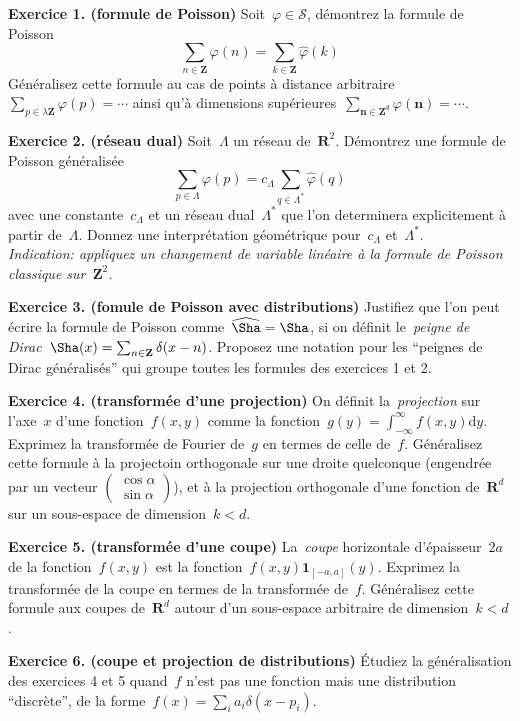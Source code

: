 \documentclass[a4paper,11pt]{article}
\def\ud{\mathrm{d}}
\def\R{\mathbf{R}}
\def\S{\mathcal{S}}
\def\Z{\mathbf{Z}}
\begin{document}
{\bf Exercice 1. (formule de Poisson)}
Soit~$\varphi\in\S$, démontrez la formule de Poisson
\[
	\sum_{n\in\Z}\varphi(n)=\sum_{k\in\Z}\widehat\varphi(k)
\]
Généralisez cette formule au cas de points à distance
arbitraire~$\displaystyle\sum_{p\in\lambda\Z}\varphi(p)=\cdots$ ainsi qu'à
dimensions
supérieures~$\displaystyle\sum_{\mathbf{n}\in\Z^d}\varphi(\mathbf{n})=\cdots$.

{\bf Exercice 2. (réseau dual)}
Soit~$\Lambda$ un réseau de~$\R^2$.
Démontrez une formule de Poisson généralisée
\[
	\sum_{p\in\Lambda}\varphi(p)
	=
	c_\Lambda\sum_{q\in\Lambda^*}\widehat\varphi(q)
\]
avec une constante~$c_\Lambda$ et un réseau dual~$\Lambda^*$ que l'on
determinera explicitement à partir de~$\Lambda$.  Donnez une interprétation
géométrique pour~$c_\Lambda$ et~$\Lambda^*$.\\
{\sl Indication: appliquez un changement de variable linéaire à la formule de
Poisson classique sur~$\Z^2$.}

{\bf Exercice 3. (fomule de Poisson avec distributions)}
Justifiez que l'on peut écrire la formule de Poisson comme~$\widehat\Sha=\Sha$,
si on définit le~\emph{peigne de Dirac}~$\Sha(x)=\sum_{n\in\Z}\delta(x-n)$.
Proposez une notation pour les ``peignes de Dirac généralisés'' qui groupe
toutes les formules des exercices 1 et 2.

{\bf Exercice 4. (transformée d'une projection)}
On définit la~\emph{projection} sur l'axe~$x$ d'une fonction~$f(x,y)$ comme la
fonction~$g(y)=\int_{-\infty}^\infty f(x,y)\ud y$.  Exprimez la transformée de
Fourier de~$g$ en termes de celle de~$f$.  Généralisez cette formule à la
projectoin orthogonale sur une droite quelconque (engendrée par un vecteur
$\left(\begin{smallmatrix}\cos\alpha\\\sin\alpha\end{smallmatrix}\right)$), et à
la projection orthogonale d'une fonction de~$\R^d$ sur un sous-espace
de dimension~$k<d$.

{\bf Exercice 5. (transformée d'une coupe)}
La~\emph{coupe} horizontale d'épaisseur~$2a$ de la fonction~$f(x,y)$ est la
fonction~$f(x,y)\mathbf{1}_{[-a,a]}(y)$.  Exprimez la transformée de la coupe
en termes de la transformée de~$f$.  Généralisez cette formule aux coupes
de~$\R^d$ autour d'un sous-espace arbitraire de dimension~$k<d$.

{\bf Exercice 6. (coupe et projection de distributions)}
Étudiez la généralisation des exercices 4 et 5 quand~$f$ n'est pas une fonction
mais une distribution ``discrète'', de la forme~$f(x)=\sum_ia_i\delta(x-p_i)$.
\end{document}
